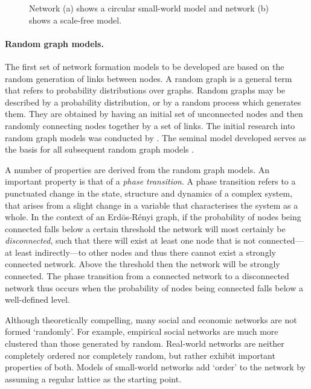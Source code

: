 \begin{figure}[t]
\begin{center}
\end{center}
\caption[Small-world and scale-free networks]{Network (a) shows a circular small-world model and network (b) shows a scale-free model.}
\label{networks}
\end{figure}

\paragraph{Random graph models.}

The first set of network formation models to be developed are based on the random generation of links between nodes. A random graph is a general term that refers to probability distributions over graphs. Random graphs may be described by a probability distribution, or by a random process which generates them. They are obtained by having an initial set of unconnected nodes and then randomly connecting nodes together by a set of links. The initial research into random graph models was conducted by \citet{ErdosRenyi1959}. The seminal model developed serves as the basis for all subsequent random graph models \citep{Gilbert1959, Bollobas2001}.

A number of properties are derived from the random graph models. An important property is that of a \emph{phase transition}. A phase transition refers to a punctuated change in the state, structure and dynamics of a complex system, that arises from a slight change in a variable that characterises the system as a whole. In the context of an Erd\"{o}s-R\'{e}nyi graph, if the probability of nodes being connected falls below a certain threshold the network will most certainly be \emph{disconnected}, such that there will exist at least one node that is not connected---at least indirectly---to other nodes and thus there cannot exist a strongly connected network. Above the threshold then the network will be strongly connected. The phase transition from a connected network to a disconnected network thus occurs when the probability of nodes being connected falls below a well-defined level.

Although theoretically compelling, many social and economic networks are not formed `randomly'. For example, empirical social networks are much more clustered than those generated by random. Real-world networks are neither completely ordered nor completely random, but rather exhibit important properties of both. Models of small-world networks add `order' to the network by assuming a regular lattice as the starting point.


